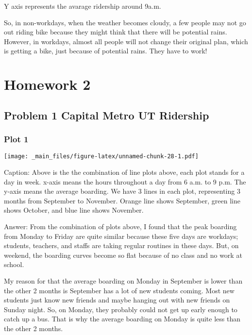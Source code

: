\documentclass[
]{article}
\begin{document}
Y axis represents the avarage ridership around 9a.m.

So, in non-workdays, when the weather becomes cloudy, a few people may not go out riding bike because they might think that there will be potential rains. However, in workdays, almost all people will not change their original plan, which is getting a bike, just because of potential rains. They have to work!

\hypertarget{homework-2}{%
\section{Homework 2}\label{homework-2}}

\hypertarget{problem-1-capital-metro-ut-ridership}{%
\subsection{Problem 1 Capital Metro UT Ridership}\label{problem-1-capital-metro-ut-ridership}}

\hypertarget{plot-1}{%
\subsubsection{Plot 1}\label{plot-1}}

\texttt{[image: \_main\_files/figure-latex/unnamed-chunk-28-1.pdf]}

Caption: Above is the the combination of line plots above, each plot stands for a day in week. x-axis means the hours throughout a day from 6 a.m. to 9 p.m. The y-axis means the average boarding. We have 3 lines in each plot, representing 3 months from September to November. Orange line shows September, green line shows October, and blue line shows November.

Answer: From the combination of plots above, I found that the peak boarding from Monday to Friday are quite similar because these five days are workdays; students, teachers, and staffs are taking regular routines in these days. But, on weekend, the boarding curves become so flat because of no class and no work at school.

My reason for that the average boarding on Monday in September is lower than the other 2 months is September has a lot of new students coming. Most new students just know new friends and maybe hanging out with new friends on Sunday night. So, on Monday, they probably could not get up early enough to catch up a bus. That is why the average boarding on Monday is quite less than the other 2 months.
\end{document}
